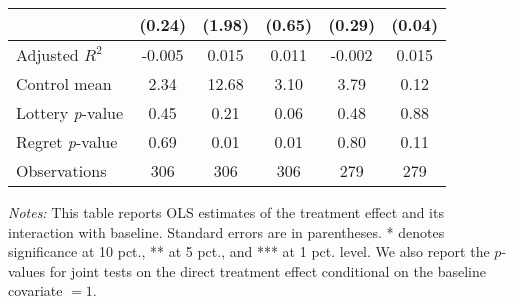 \begin{table}[htbp]
{\begin{threeparttable}
\begin{tabular}{l*{5}{c}}
                &   (0.24)         &   (1.98)         &   (0.65)         &   (0.29)         &   (0.04)         \\
\midrule
Adjusted \(R^{2}\)&   -0.005         &    0.015         &    0.011         &   -0.002         &    0.015         \\
Control mean    &     2.34         &    12.68         &     3.10         &     3.79         &     0.12         \\
Lottery \emph{p}-value&     0.45         &     0.21         &     0.06         &     0.48         &     0.88         \\
Regret \emph{p}-value&     0.69         &     0.01         &     0.01         &     0.80         &     0.11         \\
Observations    &      306         &      306         &      306         &      279         &      279         \\
\bottomrule \end{tabular} \begin{tablenotes}[flushleft] \footnotesize \item \emph{Notes:} This table reports OLS estimates of the treatment effect and its interaction with baseline. Standard errors are in parentheses. * denotes significance at 10 pct., ** at 5 pct., and *** at 1 pct. level. We also report the \(p\)-values for joint tests on the direct treatment effect conditional on the baseline covariate $= 1$. \end{tablenotes} \end{threeparttable} } \end{table}
